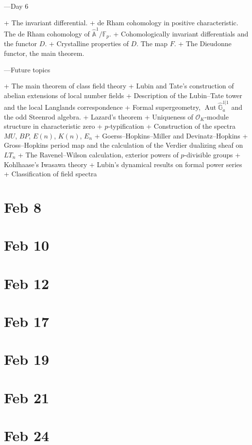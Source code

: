 \documentclass[12pt]{book}
\newcommand{\F}{\mathbb F}
\newcommand{\G}{\widehat{\mathbb G}}
\newcommand{\A}{\widehat{\mathbb{A}}}
\renewcommand{\O}{\mathcal O}
\newcommand{\<}{\langle}
\renewcommand{\>}{\rangle}
\DeclareMathOperator{\Aut}{Aut}
\numberwithin{equation}{section}
\theoremstyle{plain}
\theoremstyle{definition}
\theoremstyle{remark}
\begin{document}
---Day 6

+ The invariant differential.
+ de Rham cohomology in positive characteristic.  The de Rham cohomology of $\A^1 / \F_p$.
+ Cohomologically invariant differentials and the functor $D$.
+ Crystalline properties of $D$.  The map $F$.
+ The Dieudonne functor, the main theorem.

---Future topics

+ The main theorem of class field theory
+ Lubin and Tate's construction of abelian extensions of local number fields
+ Description of the Lubin--Tate tower and the local Langlands correspondence
+ Formal supergeometry, $\Aut \G_a^{1 | 1}$ and the odd Steenrod algebra.
+ Lazard's theorem
+ Uniqueness of $\O_K$-module structure in characteristic zero
+ $p$-typification
+ Construction of the spectra $MU$, $BP$, $E(n)$, $K(n)$, $E_n$
+ Goerss--Hopkins--Miller and Devinatz--Hopkins
+ Gross--Hopkins period map and the calculation of the Verdier dualizing sheaf on $LT_n$
+ The Ravenel--Wilson calculation, exterior powers of $p$-divisible groups
+ Kohlhaase's Iwasawa theory
+ Lubin's dynamical results on formal power series
+ Classification of field spectra



\section*{Feb 8}

\section*{Feb 10}

\section*{Feb 12}

\section*{Feb 17}

\section*{Feb 19}

\section*{Feb 21}

\section*{Feb 24}
\end{document}
